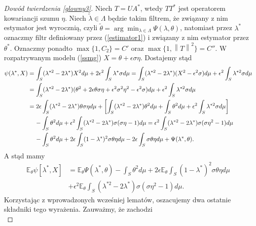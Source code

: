 \documentclass[man,mfiu]{mgrwms}
\newcommand{\norm}[1]{\left\lVert#1\right\rVert}
\begin{document}
\begin{proof}[Dowód twierdzenia \ref{glowny3}]
Niech $T=UA^*$, wtedy $TT^*$ jest operatorem kowariancji szumu $\eta$. Niech $\tilde{\lambda}\in \Lambda$ będzie takim filtrem, że związany z nim estymator jest wyrocznią, czyli $\tilde{\theta}=\arg \min_{\lambda\in \Lambda}\Psi(\lambda,\theta)$, natomiast przez $\lambda^*$ oznaczmy filtr definiowany przez (\ref{estimator1}) i związany z nim estymator przez $\theta^*$. Oznaczmy ponadto $\max\{1,C_2\}=C'$ oraz $\max\{1,\norm{T}^2\}=C''$.
W rozpatrywanym modelu (\ref{ssmg}) $X=\theta+\epsilon\sigma\eta$. Dostajemy stąd
\begin{displaymath}
\begin{split}
\psi(\lambda^*,X)&=\int_S(\lambda^{*2}-2\lambda^*)X^2d\mu+2\epsilon^2\int_S\lambda^*\sigma d\mu=\int_S(\lambda^{*2}-2\lambda^*)(X^2-\epsilon^2\sigma)d\mu+\epsilon^2\int_S\lambda^{*2}\sigma d\mu\\
&=\int_S(\lambda^{*2}-2\lambda^*)(\theta^2+2\epsilon\theta\sigma\eta+\epsilon^2\sigma^2\eta^2-\epsilon^2\sigma)d\mu+\epsilon^2\int_S\lambda^{*2}\sigma d\mu\\
&=2\epsilon\int_S(\lambda^{*2}-2\lambda^*)\theta\sigma\eta d\mu+\left[\int_S(\lambda^{*2}-2\lambda^*)\theta^2d\mu+\int_S\theta^2d\mu+\epsilon^2\int_S\lambda^{*2}\sigma d\mu\right]\\&\hspace{4mm} -\int_S\theta^2d\mu+\epsilon^2\int_S(\lambda^{*2}-2\lambda^*)\sigma(\sigma\eta-1)d\mu=\epsilon^2\int_S(\lambda^{*2}-2\lambda^*)\sigma(\sigma\eta^2-1)d\mu\\
&\hspace{4mm}-\int_S\theta^2d\mu+2\epsilon\int_S(1-\lambda^*)^2\sigma\theta\eta d\mu -2\epsilon\int_S\sigma\theta\eta d\mu+\Psi(\lambda^*,\theta).
\end{split}
\end{displaymath}
A stąd mamy
\begin{displaymath}
\begin{split}
\mathbb{E}_{\theta}\psi[\lambda^*,X]&=\mathbb{E}_{\theta}\Psi(\lambda^*,\theta)-\int_S\theta ^2d\mu+2\epsilon\mathbb{E}_{\theta}\int_S(1-\lambda^*)^2\sigma \theta \eta d\mu\\
&+\epsilon^2\mathbb{E}_{\theta}\int_S(\lambda^{*2}-2\lambda^*)\sigma(\sigma\eta^2-1)d\mu.
\end{split}
\end{displaymath}
Korzystając z wprowadzonych wcześniej lematów, oszacujemy dwa ostatnie składniki tego wyrażenia. Zauważmy, że zachodzi
\begin{displaymath}

\end{displaymath}
\end{proof}
\end{document}

